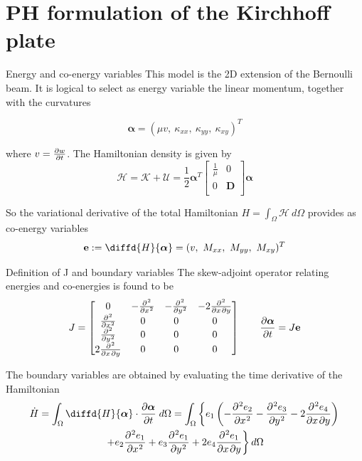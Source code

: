 \documentclass{beamer}
\begin{document}
\section{PH formulation of the Kirchhoff plate} 

\begin{frame}{Energy and co-energy variables}
This model is the 2D extension of the Bernoulli beam. It is logical to select as energy variable the linear momentum, together with the curvatures

\begin{equation*}
\bm{\alpha} = (\mu v,\ \kappa_{xx},\ \kappa_{yy},\ \kappa_{xy})^T
\end{equation*}

where $v = \diffp{w}{t}$. The Hamiltonian density is given by 
\begin{equation*}
\mathcal{H} = \mathcal{K} + \mathcal{U} = \frac{1}{2} \bm{\alpha}^T \begin{bmatrix}
\frac{1}{\mu} & 0 \\
0 & \bm{D} \\
\end{bmatrix} \bm{\alpha}
\end{equation*}

So the variational derivative of the total Hamiltonian $H = \int_{\Omega} \mathcal{H} \ d\Omega$ provides as co-energy variables
\begin{equation*}
\mathbf{e} := \diffd{H}{\bm{\alpha}} = (v,\ M_{xx},\ M_{yy},\ M_{xy})^T
\end{equation*}
 
\end{frame}



\begin{frame}{Definition of J and boundary variables}
The skew-adjoint operator relating energies and co-energies is found to be 
\begin{equation*}
J = 
\begin{bmatrix}
0 & -\diffp[2]{}{x} & -\diffp[2]{}{y} & - 2 \diffp{}{x,y}\\
\diffp[2]{}{x} & 0 & 0 & 0 \\
\diffp[2]{}{y} & 0 & 0 & 0 \\
2 \diffp{}{x,y} & 0 & 0 & 0 \\
\end{bmatrix} 	\qquad
\diffp{\bm{\alpha}}{t} = J \mathbf{e} 
\end{equation*}
\begin{tcolorbox}
	The boundary variables are obtained by evaluating the time derivative of the Hamiltonian
	\begin{multline*}
	\dot{H} = \int_\Omega \diffd{H}{\bm{\alpha}}   \cdot \diffp{\bm{\alpha}}{t} \; d\Omega = \int_\Omega \left\{ e_1 \left(-\diffp[2]{e_2}{x} -\diffp[2]{e_3}{y} - 2 \diffp{e_4}{x,y} \right) \right. \\ \left. + e_2 \diffp[2]{e_1}{x} + e_3 \diffp[2]{e_1}{y} + 2 e_4 \diffp{e_1}{x,y}  \right\} d\Omega
	\end{multline*}
\end{tcolorbox}



\end{frame}
\end{document}
